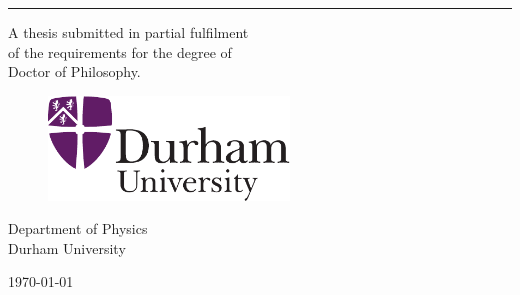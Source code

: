   \chapter*{}
  \thispagestyle{empty} 
  \vspace{-1cm}
  \begin{center}
  {\huge\textbf{\thesistitle}\par}

  \vspace{1.5cm} {\Large{\textbf{\myname}}}
  \par
  \rule{8cm}{0.2mm} \vspace{0.7cm} \par {A thesis submitted in
  partial fulfilment \\of the requirements for the degree of
  \\Doctor of Philosophy.}
  \vspace{1.0truecm} %
  \par
  \begin{figure}[h]
  \centering \includegraphics[width=6.4cm]{figs/crest.pdf}
  \end{figure}

  {\large Department of Physics} \vspace{0.15cm}\\{\large Durham
  University} \vspace{0.5cm}
  \\
  \begin{large}
  \today
  \end{large}
  \end{center}

  \newpage